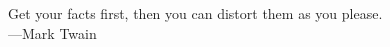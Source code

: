 \vspace*{\fill}
Get your facts first, then you can distort them as you please. \\ ---Mark Twain
\vspace*{\fill} 
